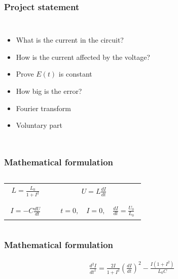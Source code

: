 \documentclass[aspectratio=1610]{beamer}
\begin{document}
\begin{frame}
\frametitle{Project statement}
\begin{columns}
\column{37em}
\begin{itemize}\itemsep1em
  \item<1-> What is the current in the circuit?
  \item<2-> How is the current affected by the voltage?
  \item<3-> Prove $E(t)$ is constant
  \item<4-> How big is the error?
  \item<5-> Fourier transform
  \item<6-> Voluntary part
\end{itemize}
\end{columns}
\end{frame}
\begin{frame}
\frametitle{Mathematical formulation}
\begin{columns}
\column{34em}
\huge
\begin{tabular}{c c}
	{$\!\begin{aligned}
		L = \frac{L_{0}}{1+I^{2}}
	\end{aligned} $}&
		{$\!\begin{aligned}
		U = L\frac{dI}{dt}
	\end{aligned}$}\\\\
		{$\!\begin{aligned}
		I = -C\frac{dU}{dt}
	\end{aligned}$}&
		{$\!\begin{aligned}
		\quad t=0, \quad I=0,\quad \frac{dI}{dt}=\frac{U_{0}}{L_{0}}
	\end{aligned}$}
\end{tabular}
\end{columns}
\end{frame}
\begin{frame}
\frametitle{Mathematical formulation}
\huge
\begin{align*}
\frac{d^{2}I}{dt^{2}}=\frac{2I}{1+I^{2}}\left(\frac{dI}{dt}\right)^{2}-\frac{I\left(1+I^{2}\right)}{L_{0}C}
\end{align*}
\end{frame}
\end{document}
